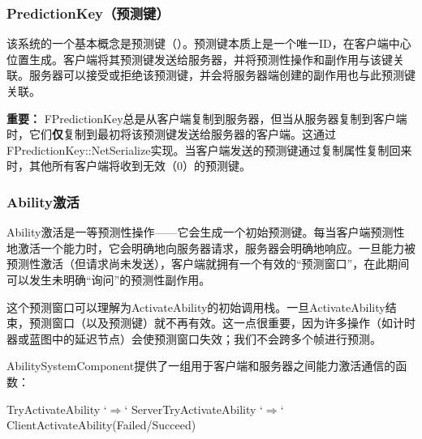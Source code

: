 \documentclass[10pt,CJKmath]{ctexart}
\begin{document}
\subsubsection{PredictionKey（预测键）}
该系统的一个基本概念是预测键（）。预测键本质上是一个唯一ID，在客户端中心位置生成。客户端将其预测键发送给服务器，并将预测性操作和副作用与该键关联。服务器可以接受或拒绝该预测键，并会将服务器端创建的副作用也与此预测键关联。

\textbf{重要：} FPredictionKey总是从客户端复制到服务器，但当从服务器复制到客户端时，它们\textbf{仅}复制到最初将该预测键发送给服务器的客户端。这通过FPredictionKey::NetSerialize实现。当客户端发送的预测键通过复制属性复制回来时，其他所有客户端将收到无效（0）的预测键。

\subsubsection{Ability激活}
Ability激活是一等预测性操作——它会生成一个初始预测键。每当客户端预测性地激活一个能力时，它会明确地向服务器请求，服务器会明确地响应。一旦能力被预测性激活（但请求尚未发送），客户端就拥有一个有效的“预测窗口”，在此期间可以发生未明确“询问”的预测性副作用。

这个预测窗口可以理解为ActivateAbility的初始调用栈。一旦ActivateAbility结束，预测窗口（以及预测键）就不再有效。这一点很重要，因为许多操作（如计时器或蓝图中的延迟节点）会使预测窗口失效；我们不会跨多个帧进行预测。

AbilitySystemComponent提供了一组用于客户端和服务器之间能力激活通信的函数：
\begin{code}
TryActivateAbility `$\Rightarrow$` ServerTryActivateAbility `$\Rightarrow$` ClientActivateAbility(Failed/Succeed)
\end{code}
\end{document}
